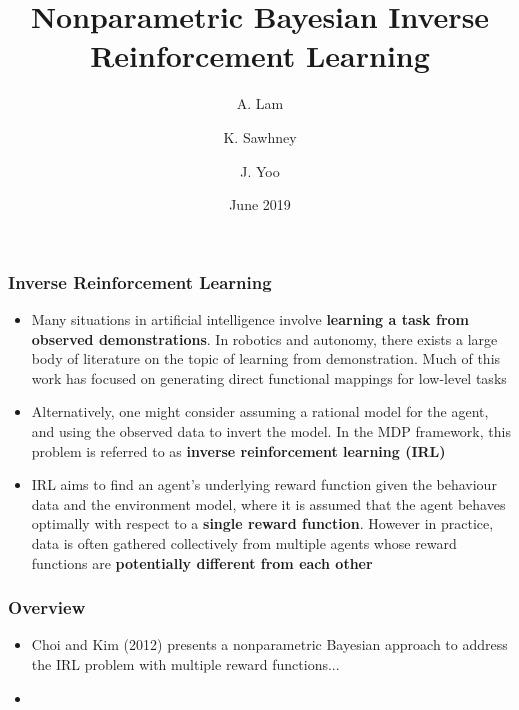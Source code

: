 \documentclass{beamer}
\title[]{Nonparametric Bayesian Inverse Reinforcement Learning}
\author[Lam, Sawhney, Yoo]{A. Lam \and K. Sawhney \and J. Yoo}
\date[June 2019]{June 2019}
\begin{document}
\frame{\titlepage}

\begin{frame}
\frametitle{Inverse Reinforcement Learning}
    \begin{itemize}
        \item Many situations in artificial intelligence involve \textbf{learning a task from observed demonstrations}. In robotics and autonomy, there exists a large body of literature on the topic of learning from demonstration. Much of this work has focused on generating direct functional mappings for low-level tasks
        \item Alternatively, one might consider assuming a rational model for the agent, and using the observed data to invert the model. In the MDP framework, this problem is referred to as ​\textbf{inverse reinforcement learning (IRL)​}
        \item IRL aims to find an agent’s underlying reward function given the behaviour data and the environment model, where it is assumed that the agent behaves optimally with respect to a \textbf{single reward function}. However in practice, data is often gathered collectively from multiple agents whose reward functions are \textbf{potentially different from each other​}
    \end{itemize}
\end{frame}

\begin{frame}
\frametitle{Overview}
    \begin{itemize}
        \item Choi and Kim (2012) presents a nonparametric Bayesian approach to address the IRL problem with multiple reward functions...
        \item
    \end{itemize}
\end{frame}
\end{document}

